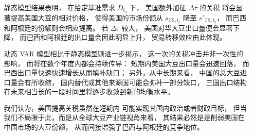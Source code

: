 \documentclass[12pt,a4paper]{ctexart} %
\begin{document}
静态模型结果表明，
在给定基准需求 $D_{t_0}$ 下，
美国额外加征 $\Delta\tau$ 的关税
将会显著提高美国大豆的相对价格，
使得美国的市场份额从 $s_{\mathrm{US},t_0}$ 降至 $s'_{\mathrm{US},t_0}$，
而巴西和阿根廷的份额则会相应提高。
若 $\Delta\tau$ 较大，
美国对华大豆出口量便会显著下降，
而巴西和阿根廷的出口量会因此明显上升，
贸易转移效应由此体现。

动态 VAR 模型相比于静态模型则进一步揭示，
这一次的关税冲击并非一次性的影响，
而将在数个年度内都会持续传导：
短期内美国大豆出口量会迅速回落，
而巴西出口量快速快速增长从而填补缺口；
另外，从中长期来看，
中国的总大豆进口量会有所收缩，
国内替代或其他来源国可能会弥补一部分缺口，
三国出口结构在未来相当长的一段时间里将逐步收敛到新的均衡水平。

我们认为，美国提高关税虽然在短期内
可能实现其国内政治或者财政目标，
但当我们不局限于此，而是从全球大豆产业链视角来看，
其结果必然是是削弱美国在中国市场的大豆份额，
从而间接增强了巴西与阿根廷的竞争地位。
\end{document}
